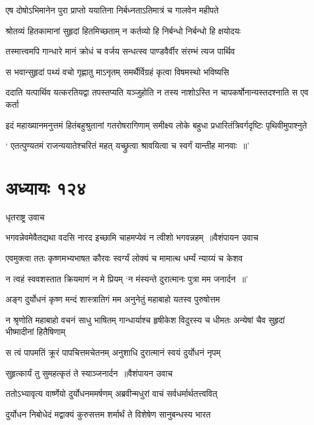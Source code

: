 \twolineshloka
{एष दोषोऽभिमानेन पुरा प्राप्तो ययातिना}
{निर्बध्नताऽतिमात्रं च गालवेन महीपते}


\twolineshloka
{श्रोतव्यं हितकामानां सुहृदां हितमिच्छताम्}
{न कर्तव्यो हि निर्बन्धो निर्बन्धो हि क्षयोदयः}


\twolineshloka
{तस्मात्त्वमपि गान्धारे मानं क्रोधं च वर्जय}
{सन्धत्स्व पाण्डवैर्वीर संरम्भं त्यज पार्थिव}


\twolineshloka
{स भवान्सुहृदां पथ्यं वचो गृह्णातु माऽनृतम्}
{समर्थैर्विग्रहं कृत्वा विषमस्थो भविष्यसि}


\twolineshloka
{ददाति यत्पार्थिव यत्करतियद्वा तपस्तप्यति यञ्जुहोति}
{न तस्य नाशोऽस्ति न चापकर्षोनान्यस्तदश्नाति स एव कर्ता}


\twolineshloka
{इदं महाख्यानमनुत्तमं हितंबहुश्रुतानां गतरोषरागिणाम्}
{समीक्ष्य लोके बहुधा प्रधारितंत्रिवर्गदृष्टिः पृथिवीमुपाश्नुते}


\twolineshloka
{` एतत्पुण्यतमं राजन्ययातेश्चरितं महत्}
{यच्छ्रुत्वा श्रावयित्वा च स्वर्गं यान्तीह मानवाः ॥'}


\chapter{अध्यायः १२४}
\twolineshloka
{धृतराष्ट्र उवाच}
{}


\threelineshloka
{भगवन्नेवमेवैतद्यथा वदसि नारद}
{इच्छामि चाहमप्येवं न त्वीशो भगवन्नहम् ॥वैशंपायन उवाच}
{}


\twolineshloka
{एवमुक्त्वा ततः कृष्णमभ्यभाषत कौरवः}
{स्वर्ग्यं लोक्यं च मामात्थ धर्म्यं न्याय्यं च केशव}


\twolineshloka
{न त्वहं स्ववशस्तात क्रियमाणं न मे प्रियम्}
{`न मंस्यन्ते दुरात्मानः पुत्रा मम जनार्दन ॥'}


\twolineshloka
{अङ्ग दुर्योधनं कृष्ण मन्दं शास्त्रातिगं मम}
{अनुनेतुं महाबाहो यतस्व पुरुषोत्तम}


\threelineshloka
{न श्रृणोति महाबाहो वचनं साधु भाषितम्}
{गान्धार्याश्च हृषीकेश विदुरस्य च धीमतः}
{अन्येषां चैव सुहृदां भीष्मादीनां हितैषिणाम्}


\twolineshloka
{स त्वं पापमतिं क्रूरं पापचित्तमचेतनम्}
{अनुशाधि दुरात्मानं स्वयं दुर्योधनं नृपम्}


\twolineshloka
{सुहृत्कार्यं तु सुमहत्कृतं ते स्याञ्जनार्दन ॥वैशंपायन उवाच}
{}


\twolineshloka
{ततोऽभ्यावृत्य वार्ष्णेयो दुर्योधनममर्षणम्}
{अब्रवीन्मधुरां वाचं सर्वधर्मार्थतत्त्ववित्}


\twolineshloka
{दुर्योधन निबोधेदं मद्वाक्यं कुरुसत्तम}
{शर्मार्थं ते विशेषेण सानुबन्धस्य भारत}


